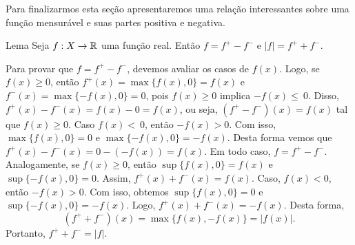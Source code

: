 \begin{figure}[h!]
	\centering
\end{figure}

Para finalizarmos esta seção apresentaremos uma relação interessantes sobre uma função mensurável e suas partes positiva e negativa.

    \begin{env}{Lema}
    \label{lem:f = f^+ - f^-}
        Seja $f: X \to \mathbb{R}$ uma função real. Então $f = f^+ - f^-$ e $|f| = f^+ + f^-$.
    \end{env}
    \begin{prova}
            Para provar que $f = f^+ - f^-$, devemos avaliar os casos de $f(x)$. 
            Logo, se $f(x) \geq 0$, então $f^+(x) = \max\{f(x), 0\} = f(x)$ e $f^-(x) = \max\{-f(x), 0\} = 0$, pois $f(x) \geq 0$ implica  $- f(x) \leq~0$.
            Disso, $f^+(x) - f^-(x) = f(x) - 0 = f(x)$, ou seja, $(f^+ - f^-)(x) = f(x)$ tal que $f(x) \geq 0$.
            Caso $f(x) <~0$, então $- f(x) > 0$. 
            Com isso,  $\max\{f(x), 0\} = 0$ e $\max\{-f(x), 0\} = -f(x)$.
            Desta forma vemos que
            $f^+(x) - f^-(x) = 0 - (-f(x)) = f(x)$.
            Em todo caso, $f = f^+ - f^-$.
			Analogamente, se $f(x) \geq 0$, então  $\sup\{f(x), 0\} = f(x)$ e $\sup\{-f(x), 0\} = 0$.
            Assim, $f^+(x) + f^-(x) = f(x)$.
            Caso, $f(x) < 0$, então $ - f(x) > 0$.
            Com isso, obtemos $\sup\{f(x), 0\} = 0$ e $\sup\{-f(x), 0\} = -f(x)$.
            Logo, $f^+(x) + f^-(x) = -f(x)$.
            Desta forma, 
            $$
            (f^+ + f^-)(x) = \max\{f(x), -f(x)\} = |f(x)|.
            $$
            Portanto, $f^+ + f^- = |f|$.
    \end{prova}

